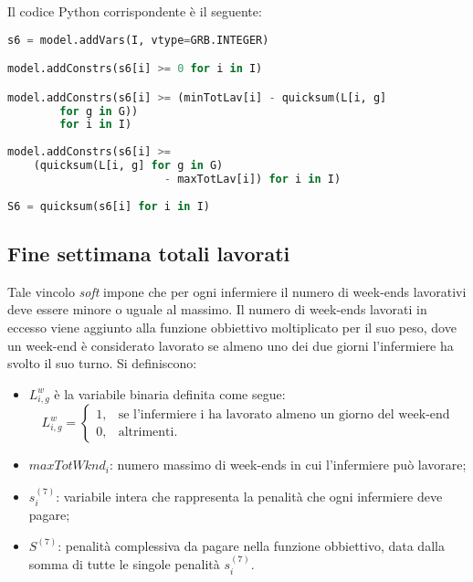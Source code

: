Il codice Python corrispondente è il seguente:
\begin{lstlisting}[language=Python]
s6 = model.addVars(I, vtype=GRB.INTEGER)

model.addConstrs(s6[i] >= 0 for i in I)

model.addConstrs(s6[i] >= (minTotLav[i] - quicksum(L[i, g] 
		for g in G))
   	 	for i in I)
                        
model.addConstrs(s6[i] >= 
	(quicksum(L[i, g] for g in G) 
                        - maxTotLav[i]) for i in I)
                       			 
S6 = quicksum(s6[i] for i in I)
\end{lstlisting}


\subsection{Fine settimana totali lavorati}
Tale vincolo \textit{soft} impone che per ogni infermiere il numero di week-ends lavorativi deve essere minore o uguale al massimo. Il numero di week-ends lavorati in eccesso viene aggiunto alla funzione obbiettivo moltiplicato per il suo peso, dove un week-end è considerato lavorato se almeno uno dei due giorni l'infermiere ha svolto il suo turno. 
Si definiscono:
\begin{itemize}
\item $L_{i, g}^w$ è la variabile binaria definita come segue:
\begin{equation}
\label{eq:varLavoratoWeekEnd}
L_{i, g}^w=
\begin{cases}
1, & \text{se l'infermiere i ha lavorato almeno un giorno del week-end} \\
0, & \text{altrimenti.}
\end{cases}
\end{equation}
\item $maxTotWknd_i$: numero massimo di week-ends in cui l'infermiere può lavorare;
\item $s^{(7)}_i$: variabile intera che rappresenta la penalità che ogni infermiere deve pagare;
\item $S^{(7)}$: penalità complessiva da pagare nella funzione obbiettivo, data dalla somma di tutte le singole penalità $s^{(7)}_i$.
\end{itemize}

